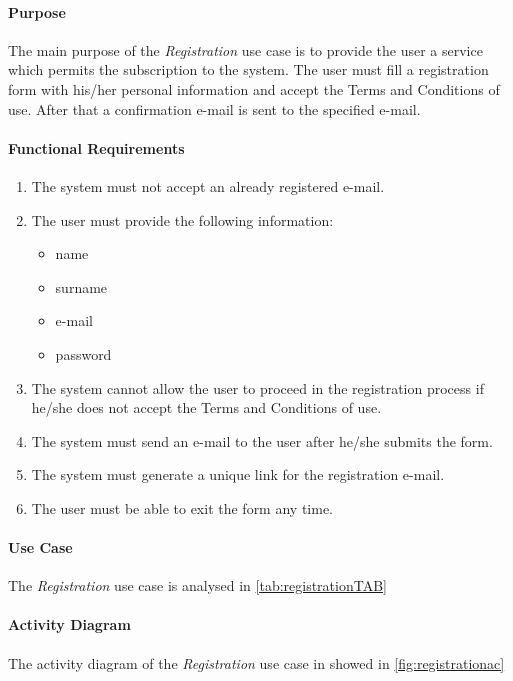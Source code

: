 \paragraph*{Purpose\\}
The main purpose of the \emph{Registration} use case is to provide the user a service which permits the subscription to the system. The user must fill a registration form with his/her personal information and accept the Terms and Conditions of use. After that a confirmation e-mail is sent to the specified e-mail.
\paragraph{Functional Requirements}
\begin{enumerate}[label=R.\arabic*:]
	\item {\label{req:alreadyregistered}}The system must not accept an already registered e-mail.
	\item {\label{req:userinformation}}The user must provide the following information:
	\begin{itemize}
		\item name
		\item surname
		\item e-mail
		\item password
	\end{itemize}
	\item {\label{req:conditionsaccepted}}The system cannot allow the user to proceed in the registration process if he/she does not accept the Terms and Conditions of use.
	\item The system must send an e-mail to the user after he/she submits the form.	
	\item The system must generate a unique link for the registration e-mail.
	\item The user must be able to exit the form any time.
\end{enumerate}

\paragraph*{Use Case\\}
The \emph{Registration} use case is analysed in \autoref{tab:registrationTAB}
\paragraph*{Activity Diagram\\}
The activity diagram of the \emph{Registration} use case in showed in \autoref{fig:registrationac}
